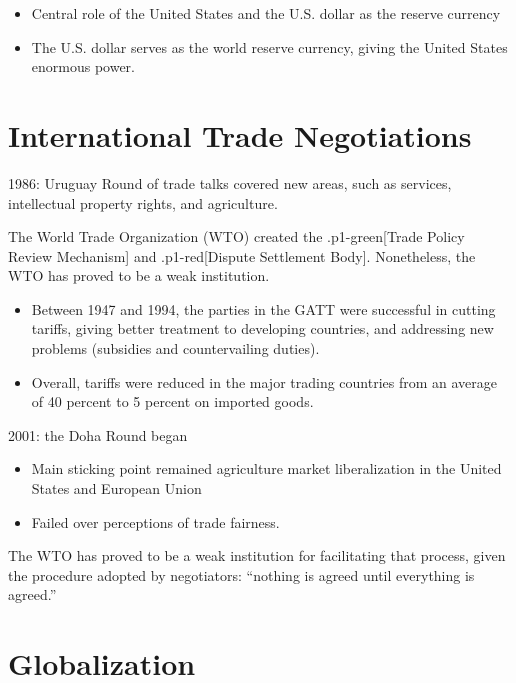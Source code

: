\documentclass[
]{book}
\begin{document}
\begin{itemize}
\item
  Central role of the United States and the U.S. dollar as the reserve currency
\item
  The U.S. dollar serves as the world reserve currency, giving the United States enormous power.
\end{itemize}

\hypertarget{international-trade-negotiations}{%
\section{International Trade Negotiations}\label{international-trade-negotiations}}

1986: Uruguay Round of trade talks covered new areas, such as services, intellectual property rights, and agriculture.

The World Trade Organization (WTO) created the .p1-green{[}Trade Policy Review Mechanism{]} and .p1-red{[}Dispute Settlement Body{]}. Nonetheless, the WTO has proved to be a weak institution.

\begin{itemize}
\item
  Between 1947 and 1994, the parties in the GATT were successful in cutting tariffs, giving better treatment to developing countries, and addressing new problems (subsidies and countervailing duties).
\item
  Overall, tariffs were reduced in the major trading countries from an average of 40 percent to 5 percent on imported goods.
\end{itemize}

2001: the Doha Round began

\begin{itemize}
\item
  Main sticking point remained agriculture market liberalization in the United States and European Union
\item
  Failed over perceptions of trade fairness.
\end{itemize}

The WTO has proved to be a weak institution for facilitating that process, given the procedure adopted by negotiators: ``nothing is agreed until everything is agreed.''

\hypertarget{globalization}{%
\section{Globalization}\label{globalization}}
\end{document}
